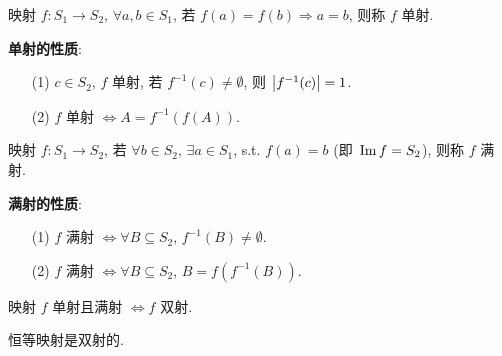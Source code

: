\documentclass{note}
\begin{document}
\begin{df}
    映射 $f:S_1\rightarrow S_2$, $\forall a,b\in S_1$, 若 $f(a)=f(b)\Longrightarrow a=b$, 则称 $f$ 单射.
\end{df}

\textbf{单射的性质}:
\begin{itemize}
    \item[(1)] $c\in S_2$, $f$ 单射, 若 $f^{-1}(c)\neq\emptyset$, 则 $\left\lvert f^{-1}(c)\right\rvert=1$.
    \item[(2)] $f$ 单射 $\Longleftrightarrow A=f^{-1}(f(A))$.
\end{itemize}

\begin{df}[满射 (Surjective)]
    映射 $f:S_1\rightarrow S_2$, 若 $\forall b\in S_2$, $\exists a\in S_1$, s.t. $f(a)=b$ (即 $\,\mathrm{Im}\, f=S_2$), 则称 $f$ 满射.
\end{df}

\textbf{满射的性质}:
\begin{itemize}
    \item[(1)] $f$ 满射 $\Longleftrightarrow\forall B\subseteq S_2$, $f^{-1}(B)\neq\emptyset$.
    \item[(2)] $f$ 满射 $\Longleftrightarrow\forall B\subseteq S_2$, $B=f(f^{-1}(B))$.
\end{itemize}

\begin{df}[双射]
    映射 $f$ 单射且满射 $\Longleftrightarrow f$ 双射.
\end{df}

\begin{eg}
    恒等映射是双射的.
\end{eg}
\end{document}
